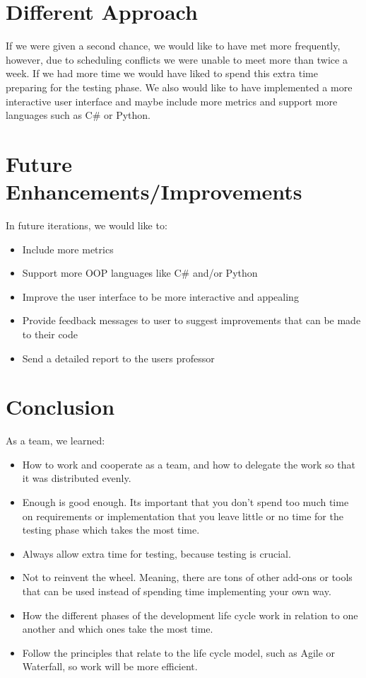 \documentclass{scrreprt}
\begin{document}
	

	{\let\clearpage\relax \chapter{Different Approach}}
	If we were given a second chance, we would like to have met more frequently, however, due to scheduling conflicts we were unable to meet more than twice a week. If we had more time we would have liked to spend this extra time preparing for the testing phase. We also would like to have implemented a more interactive user interface and maybe include more metrics and support more languages such as C\# or Python.


	{\let\clearpage\relax\pagebreak \chapter{Future Enhancements/Improvements}}
	In future iterations, we would like to:\\
	
	\begin{itemize}
		\item Include more metrics
		\item Support more OOP languages like C\# and/or Python
		\item Improve the user interface to be more interactive and appealing
		\item Provide feedback messages to user to suggest improvements that can be made to their code
		\item Send a detailed report to the users professor
	\end{itemize}
	
	


	{\let\clearpage\relax \chapter{Conclusion}}
	As a team, we learned:
		\begin{itemize}
		\item How to work and cooperate as a team, and how to delegate the work so that it was distributed evenly.
		\item Enough is good enough. Its important that you don't spend too much time on requirements or implementation that you leave little or no time for the testing phase which takes the most time. 
		\item Always allow extra time for testing, because testing is crucial.
		\item Not to reinvent the wheel. Meaning, there are tons of other add-ons or tools that can be used instead of spending time implementing your own way.
		\item How the different phases of the development life cycle work in relation to one another and which ones take the most time.
		\item Follow the principles that relate to the life cycle model, such as Agile or Waterfall, so work will be more efficient.
	\end{itemize}
\end{document}
